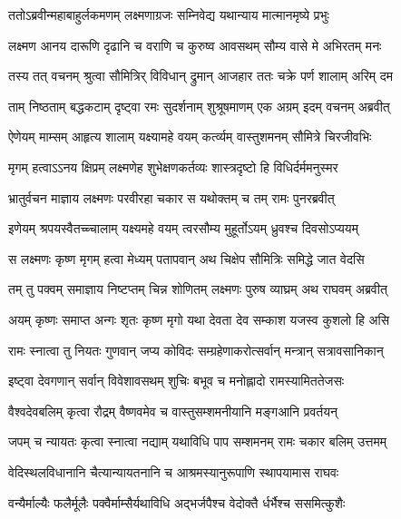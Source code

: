 \twolineshloka
{ततोऽब्रवीन्महाबाहुर्लकमणम् लक्ष्मणाग्रजः}
{सम्निवेद्य यथान्याय मात्मानमृष्ये प्रभुः} %

\twolineshloka
{लक्ष्मण आनय दारूणि दृढानि च वराणि च}
{कुरुष्व आवसथम् सौम्य वासे मे अभिरतम् मनः} %

\twolineshloka
{तस्य तत् वचनम् श्रुत्वा सौमित्रिर् विविधान् द्रुमान्}
{आजहार ततः चक्रे पर्ण शालाम् अरिम् दम} %

\twolineshloka
{ताम् निष्ठताम् बद्धकटाम् दृष्ट्वा रमः सुदर्शनाम्}
{शुश्रूषमाणम् एक अग्रम् इदम् वचनम् अब्रवीत्} %

\twolineshloka
{ऐणेयम् माम्सम् आहृत्य शालाम् यक्ष्यामहे वयम्}
{कर्त्व्यम् वास्तुशमनम् सौमित्रे चिरजीवभिः} %

\onelineshloka
{मृगम् हत्वाऽऽनय क्षिप्रम् लक्ष्मणेह शुभेक्षणकर्तव्यः शास्त्रदृष्टो हि विधिर्दर्ममनुस्मर} %

\twolineshloka
{भ्रातुर्वचन माज्ञाय लक्ष्मणः परवीरहा}
{चकार स यथोक्तम् च तम् रामः पुनरब्रवीत्} %

\twolineshloka
{इणेयम् श्रपयस्वैतच्च्चालाम् यक्ष्यमहे वयम्}
{त्वरसौम्य मुहूर्तोऽयम् ध्रुवश्च दिवसोऽप्ययम्} %

\twolineshloka
{स लक्ष्मणः कृष्ण मृगम् हत्वा मेध्यम् पतापवान्}
{अथ चिक्षेप सौमित्रिः समिद्धे जात वेदसि} %

\twolineshloka
{तम् तु पक्वम् समाज्ञाय निष्टप्तम् चिन्न शोणितम्}
{लक्ष्मणः पुरुष व्याघ्रम् अथ राघवम् अब्रवीत्} %

\twolineshloka
{अयम् कृष्णः समाप्त अन्गः शृतः कृष्ण मृगो यथा}
{देवता देव सम्काश यजस्व कुशलो हि असि} %

\twolineshloka
{रामः स्नात्वा तु नियतः गुणवान् जप्य कोविदः}
{सम्ग्रहेणाकरोत्सर्वान् मन्त्रान् सत्रावसानिकान्} %

\twolineshloka
{इष्ट्वा देवगणान् सर्वान् विवेशावसथम् शुचिः}
{बभूव च मनोह्लादो रामस्यामिततेजसः} %

\twolineshloka
{वैश्वदेवबलिम् कृत्वा रौद्रम् वैष्णवमेव च}
{वास्तुसम्शमनीयानि मङ्गआनि प्रवर्तयन्} %

\twolineshloka
{जपम् च न्यायतः कृत्वा स्नात्वा नद्याम् यथाविधि}
{पाप सम्शमनम् रामः चकार बलिम् उत्तमम्} %

\twolineshloka
{वेदिस्थलविधानानि चैत्यान्यायतनानि च}
{आश्रमस्यानुरूपाणि स्थापयामास राघवः} %

\twolineshloka
{वन्यैर्माल्यैः फलैर्मूलैः पक्वैर्माम्सैर्यथाविधि}
{अद्भर्जपैश्च वेदोक्तै र्धर्भैश्च ससमित्कुशैः} %


